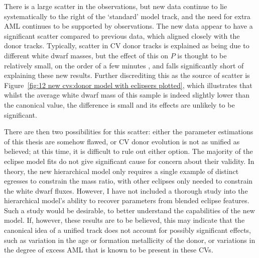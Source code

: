 There is a large scatter in the observations, but new data continue to lie systematically to the right of the `standard' model track, and the need for extra AML continues to be supported by observations.
The new data appear to have a significant scatter compared to previous data, which aligned closely with the donor tracks.
Typically, scatter in CV donor tracks is explained as being due to different white dwarf masses, but the effect of this on $P$ is thought to be relatively small, on the order of a few minutes \citep{goliasch2015}, and falls significantly short of explaining these new results.
Further discrediting this as the source of scatter is Figure~\ref{fig:12 new cvs:donor model with eclipsers plotted}, which illustrates that whilst the average white dwarf mass of this sample is indeed slightly lower than the canonical \citet{pala2020} value, the difference is small and its effects are unlikely to be significant.

There are then two possibilities for this scatter: either the parameter estimations of this thesis are somehow flawed, or CV donor evolution is not as unified as believed; at this time, it is difficult to rule out either option.
The majority of the eclipse model fits do not give significant cause for concern about their validity. In theory, the new hierarchical model only requires a single example of distinct egresses to constrain the mass ratio, with other eclipses only needed to constrain the white dwarf fluxes. However, I have not included a thorough study into the hierarchical model's ability to recover parameters from blended eclipse features. Such a study would be desirable, to better understand the capabilities of the new model.
If, however, these results are to be believed, this may indicate that the canonical idea of a unified track does not account for possibly significant effects, such as variation in the age or formation metallicity of the donor, or variations in the degree of excess AML that is known to be present in these CVs.


